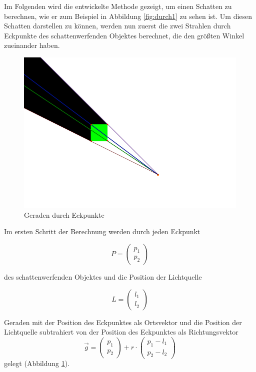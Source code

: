 Im Folgenden wird die entwickelte Methode gezeigt, um einen Schatten zu berechnen, wie er zum
Beispiel in Abbildung \ref{fig:durch1} zu sehen ist. Um diesen Schatten darstellen zu können,
werden nun zuerst die zwei Strahlen durch Eckpunkte des schattenwerfenden Objektes berechnet,
die den größten Winkel zueinander haben.

\begin{figure}[t]
	\centering
	\includegraphics[width=\columnwidth]{images/durchfuehrung_1.png}
	\caption{Geraden durch Eckpunkte}
	\label{fig:durch2}
\end{figure}

Im ersten Schritt der Berechnung werden durch jeden Eckpunkt

\begin{equation}
	P = \begin{pmatrix} p_1 \\ p_2 \end{pmatrix}
\end{equation}

des schattenwerfenden Objektes und die Position der Lichtquelle

\begin{equation}
	L = \begin{pmatrix}  l_1 \\ l_2 \end{pmatrix}
\end{equation}

Geraden mit der Position des Eckpunktes als Ortsvektor und die Position der Lichtquelle subtrahiert
von der Position des Eckpunktes als Richtungsvektor
\begin{equation}
	\vec{g} = \begin{pmatrix} p_1 \\ p_2 \end{pmatrix} + r \cdot \begin{pmatrix} p_1 - l_1 \\ p_2 - l_2 \end{pmatrix}
\end{equation}
gelegt (Abbildung \ref{fig:durch2}).

